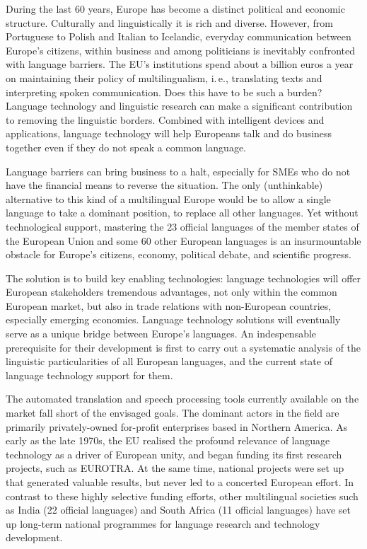 \documentclass[]{../../metanetpaper}
\begin{document}
\begin{multicols}{2}

During the last 60 years, Europe has become a distinct political and economic structure. Culturally and linguistically it is rich and diverse. However, from Portuguese to Polish and Italian to Icelandic, everyday communication between Europe’s citizens, within business and among politicians is inevitably confronted with language barriers. The EU's institutions spend about a billion euros a year on maintaining their policy of multilingualism, i.\,e., translating texts and interpreting spoken communication. Does this have to be such a burden? Language technology and linguistic research can make a significant contribution to removing the linguistic borders. Combined with intelligent devices and applications, language technology will help Europeans talk and do business together even if they do not speak a common language. 


Language barriers can bring business to a halt, especially for SMEs who do not have the financial means to reverse the situation. The only (unthinkable) alternative to this kind of a multilingual Europe would be to allow a single language to take a dominant position, to replace all other languages. 
Yet without technological support, mastering the 23 official languages of the member states of the European Union and some 60 other European languages is an insurmountable obstacle for Europe’s citizens, economy, political debate, and scientific progress. 

The solution is to build key enabling technologies: language technologies will offer European stakeholders tremendous advantages, not only within the common European market, but also in trade relations with non-European countries, especially emerging economies. Language technology solutions will eventually serve as a unique bridge between Europe's languages. An indespensable prerequisite for their development is first to carry out a systematic analysis of the linguistic particularities of all European languages, and the current state of language technology support for them.  
    
The automated translation and speech processing tools currently available on the market fall short of the envisaged goals. The dominant actors in the field are primarily privately-owned for-profit enterprises based in Northern America. As early as the late 1970s, the EU realised the profound relevance of language technology as a driver of European unity, and began funding its first research projects, such as EUROTRA. At the same time, national projects were set up that generated valuable results, but never led to a concerted European effort. In contrast to these highly selective funding efforts, other multilingual societies such as India (22 official languages) and South Africa (11 official languages) have set up long-term national programmes for language research and technology development. 


\end{multicols}
\end{document}

